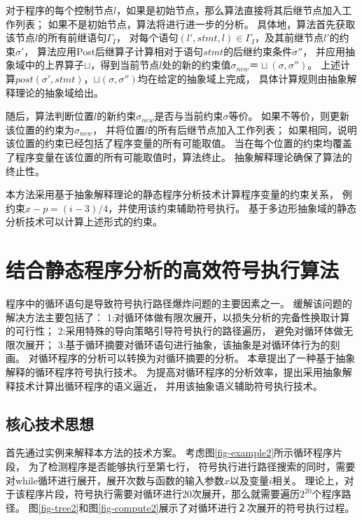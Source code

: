 对于程序的每个控制节点$l$，如果是初始节点，那么算法直接将其后继节点加入工作列表；
如果不是初始节点，算法将进行进一步的分析。
具体地，算法首先获取该节点$l$的所有前继语句$\Gamma_{I}$，
对每个语句$(l',stmt,l)\in \Gamma_{I}$，及其前继节点$l'$的约束$\sigma'$，
算法应用Post后继算子计算相对于语句$stmt$的后继约束条件$\sigma''$，
并应用抽象域中的上界算子$\sqcup$，得到当前节点$l$处的新的约束值$\sigma_{new}　＝　
\sqcup(\sigma,\sigma'')$。
上述计算$post(\sigma', stmt)$，$\sqcup(\sigma,\sigma'')$均在给定的抽象域上完成，
具体计算规则由抽象解释理论的抽象域给出。

随后，算法判断位置$l$的新约束$\sigma_{new}$是否与当前约束$\sigma$等价。
如果不等价，则更新该位置的约束为$\sigma_{new}$，
并将位置$l$的所有后继节点加入工作列表；
如果相同，说明该位置的约束已经包括了程序变量的所有可能取值。
当在每个位置的约束均覆盖了程序变量在该位置的所有可能取值时，算法终止。
抽象解释理论确保了算法的终止性。


本方法采用基于抽象解释理论的静态程序分析技术计算程序变量的约束关系，
例约束$x-p = (i-3)/4$，并使用该约束辅助符号执行。
基于多边形抽象域的静态分析技术可以计算上述形式的约束。

\section{结合静态程序分析的高效符号执行算法}
\label{sec-absint-symexe}

程序中的循环语句是导致符号执行路径爆炸问题的主要因素之一。
缓解该问题的解决方法主要包括了：
1:对循环体做有限次展开，以损失分析的完备性换取计算的可行性；
2:采用特殊的导向策略引导符号执行的路径遍历，
 避免对循环体做无限次展开；
3:基于循环摘要对循环语句进行抽象，该抽象是对循环体行为的刻画。
 对循环程序的分析可以转换为对循环摘要的分析。
本章提出了一种基于抽象解释的循环程序符号执行技术。
为提高对循环程序的分析效率，提出采用抽象解释技术计算出循环程序的语义逼近，
并用该抽象语义辅助符号执行技术。


\subsection{核心技术思想}

首先通过实例来解释本方法的技术方案。
考虑图\ref{fig-example2}所示循环程序片段， 为了检测程序是否能够执行至第七行，
符号执行进行路径搜索的同时，需要对while循环进行展开，展开次数与函数的输入参数$x$以及变量$i$相关。
理论上，对于该程序片段，符号执行需要对循环进行20次展开，那么就需要遍历$2^{20}$个程序路径。
图\ref{fig-tree2}和图\ref{fig-compute2}展示了对循环进行２次展开的符号执行过程。

